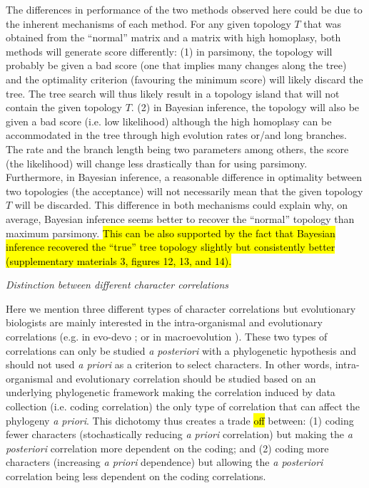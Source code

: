\documentclass[12pt,letterpaper]{article}
\renewcommand{\subsection}[1]{%
\bigskip
\begin{center}
\begin{large}
\normalfont\itshape #1
\end{large}
\end{center}}
\begin{document}

The differences in performance of the two methods observed here could be due to the inherent mechanisms of each method.
For any given topology $T$ that was obtained from the ``normal'' matrix and a matrix with high homoplasy, both methods will generate score differently:
(1) in parsimony, the topology will probably be given a bad score (one that implies many changes along the tree) and the optimality criterion (favouring the minimum score) will likely discard the tree.
The tree search will thus likely result in a topology island that will not contain the given topology $T$.
(2) in Bayesian inference, the topology will also be given a bad score (i.e. low likelihood) although the high homoplasy can be accommodated in the tree through high evolution rates or/and long branches.
The rate and the branch length being two parameters among others, the score (the likelihood) will change less drastically than for using parsimony.
Furthermore, in Bayesian inference, a reasonable difference in optimality between two topologies (the acceptance) will not necessarily mean that the given topology $T$ will be discarded.
This difference in both mechanisms could explain why, on average, Bayesian inference seems better to recover the ``normal'' topology than maximum parsimony.
\hl{This can be also supported by the fact that Bayesian inference recovered the ``true'' tree topology slightly but consistently better (supplementary materials 3, figures 12, 13, and 14).}

\subsection{Distinction between different character correlations}
Here we mention three different types of character correlations but evolutionary biologists are mainly interested in the intra-organismal and evolutionary correlations (e.g. in evo-devo \citealt{goswami2006morphological}; or in macroevolution \citealt{fitzjohn2014much}).
These two types of correlations can only be studied \textit{a posteriori} with a phylogenetic hypothesis and should not used \textit{a priori} as a criterion to select characters.
In other words, intra-organismal and evolutionary correlation should be studied based on an underlying phylogenetic framework making the correlation induced by data collection (i.e. coding correlation) the only type of correlation that can affect the phylogeny \textit{a priori}.
This dichotomy thus creates a trade \hl{off} between: (1) coding fewer characters (stochastically reducing \textit{a priori} correlation) but making the \textit{a posteriori} correlation more dependent on the coding;
and (2) coding more characters (increasing \textit{a priori} dependence) but allowing the \textit{a posteriori} correlation being less dependent on the coding correlations.
\end{document}

